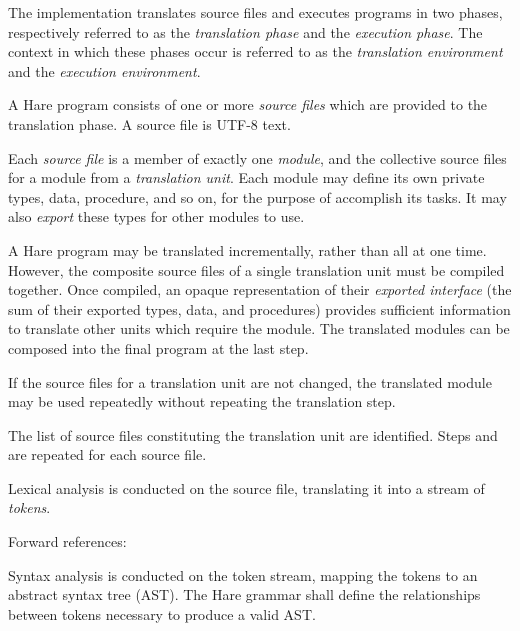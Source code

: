 
\specitem
The implementation translates source files and executes programs in two phases,
respectively referred to as the \textit{translation phase} and the
\textit{execution phase}. The context in which these phases occur is referred
to as the \textit{translation environment} and the \textit{execution
environment}.


\specsubitem
A Hare program consists of one or more \textit{source files} which are provided
to the translation phase. A source file is UTF-8 text.

\specsubitem
Each \textit{source file} is a member of exactly one \textit{module}, and the
collective source files for a module from a \textit{translation unit}. Each
module may define its own private types, data, procedure, and so on, for the
purpose of accomplish its tasks. It may also \textit{export} these types for
other modules to use.

\specsubitem
A Hare program may be translated incrementally, rather than all at one time.
However, the composite source files of a single translation unit must be
compiled together. Once compiled, an opaque representation of their
\textit{exported interface} (the sum of their exported types, data, and
procedures) provides sufficient information to translate other units which
require the module. The translated modules can be composed into the final
program at the last step.

\specsubitem
If the source files for a translation unit are not changed, the translated
module may be used repeatedly without repeating the translation step.


\specsubitem
The list of source files constituting the translation unit are identified. Steps
 and  are
repeated for each source file.

\specsubitem
Lexical analysis is conducted on the source file, translating it into a stream
of \textit{tokens}.

Forward references: 

\specsubitem
Syntax analysis is conducted on the token stream, mapping the tokens to an
abstract syntax tree (AST). The Hare grammar shall define the relationships
between tokens necessary to produce a valid AST.

